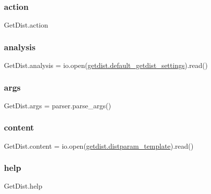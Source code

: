 \subsubsection{\texorpdfstring{action}{action}}
{\footnotesize\ttfamily Get\+Dist.\+action}

\mbox{\label{namespaceGetDist_afa77133c94abcbe09dedefa80323eb15}} 
\subsubsection{\texorpdfstring{analysis}{analysis}}
{\footnotesize\ttfamily Get\+Dist.\+analysis = io.\+open(\mbox{\hyperlink{namespacegetdist_a4940be008227154f9cd2c59d05256103}{getdist.\+default\+\_\+getdist\+\_\+settings}}).read()}

\mbox{\label{namespaceGetDist_a6ec6fa1fa24cc98a2fb4b80e79b66d74}} 
\subsubsection{\texorpdfstring{args}{args}}
{\footnotesize\ttfamily Get\+Dist.\+args = parser.\+parse\+\_\+args()}

\mbox{\label{namespaceGetDist_a805847babed811528a904a25a19dd2d3}} 
\subsubsection{\texorpdfstring{content}{content}}
{\footnotesize\ttfamily Get\+Dist.\+content = io.\+open(\mbox{\hyperlink{namespacegetdist_a5d4be353cd53f5baa773acef0b256264}{getdist.\+distparam\+\_\+template}}).read()}

\mbox{\label{namespaceGetDist_abdea6b3ce3f83b2ac4e0188519314749}} 
\subsubsection{\texorpdfstring{help}{help}}
{\footnotesize\ttfamily Get\+Dist.\+help}

